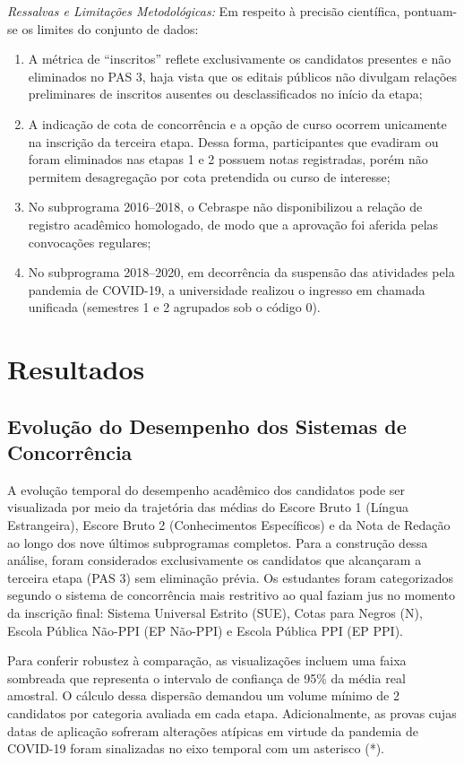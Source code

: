 \documentclass[12pt]{article}
\begin{document}
\textit{Ressalvas e Limitações Metodológicas:} Em respeito à precisão científica, pontuam-se os limites do conjunto de dados:
\begin{enumerate}
    \item A métrica de ``inscritos'' reflete exclusivamente os candidatos presentes e não eliminados no PAS 3, haja vista que os editais públicos não divulgam relações preliminares de inscritos ausentes ou desclassificados no início da etapa;
    \item A indicação de cota de concorrência e a opção de curso ocorrem unicamente na inscrição da terceira etapa. Dessa forma, participantes que evadiram ou foram eliminados nas etapas 1 e 2 possuem notas registradas, porém não permitem desagregação por cota pretendida ou curso de interesse;
    \item No subprograma 2016--2018, o Cebraspe não disponibilizou a relação de registro acadêmico homologado, de modo que a aprovação foi aferida pelas convocações regulares;
    \item No subprograma 2018--2020, em decorrência da suspensão das atividades pela pandemia de COVID-19, a universidade realizou o ingresso em chamada unificada (semestres 1 e 2 agrupados sob o código 0).
\end{enumerate}

\section{Resultados}

\subsection{Evolução do Desempenho dos Sistemas de Concorrência}

A evolução temporal do desempenho acadêmico dos candidatos pode ser visualizada por meio da trajetória das médias do Escore Bruto 1 (Língua Estrangeira), Escore Bruto 2 (Conhecimentos Específicos) e da Nota de Redação ao longo dos nove últimos subprogramas completos. Para a construção dessa análise, foram considerados exclusivamente os candidatos que alcançaram a terceira etapa (PAS 3) sem eliminação prévia. Os estudantes foram categorizados segundo o sistema de concorrência mais restritivo ao qual faziam jus no momento da inscrição final: Sistema Universal Estrito (SUE), Cotas para Negros (N), Escola Pública Não-PPI (EP Não-PPI) e Escola Pública PPI (EP PPI).

Para conferir robustez à comparação, as visualizações incluem uma faixa sombreada que representa o intervalo de confiança de 95\% da média real amostral. O cálculo dessa dispersão demandou um volume mínimo de 2 candidatos por categoria avaliada em cada etapa. Adicionalmente, as provas cujas datas de aplicação sofreram alterações atípicas em virtude da pandemia de COVID-19 foram sinalizadas no eixo temporal com um asterisco (*).
\end{document}

